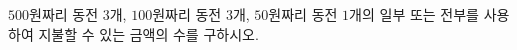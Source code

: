 \hspace*{2mm}\begin{minipage}[t]{\dimexpr\linewidth-2mm\relax}\vspace{0pt}
$500$원짜리 동전 $3$개, $100$원짜리 동전 $3$개, $50$원짜리 동전 $1$개의 일부 또는 전부를 사용하여 지불할 수 있는 금액의 수를 구하시오. \end{minipage}
